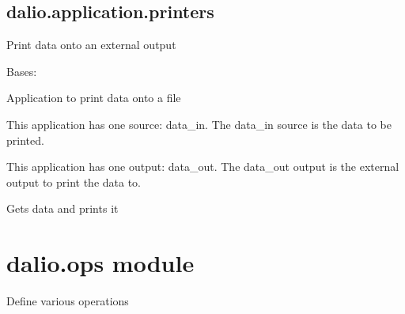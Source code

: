 \documentclass[letterpaper,10pt,english]{sphinxmanual}
\begin{document}
\section{dalio.application.printers}
\label{\detokenize{dalio.application:module-dalio.application.printers}}\label{\detokenize{dalio.application:dalio-application-printers}}
Print data onto an external output

\begin{fulllineitems}
\label{\detokenize{dalio.application:dalio.application.printers.FilePrinter}}
Bases: {\hyperref[\detokenize{dalio.application:dalio.application.application.Application}]{}}

Application to print data onto a file

This application has one source: data\_in. The data\_in source is the data
to be printed.

This application has one output: data\_out. The data\_out output is the
external output to print the data to.

\begin{fulllineitems}
\label{\detokenize{dalio.application:dalio.application.printers.FilePrinter.run}}
Gets data and prints it

\end{fulllineitems}


\end{fulllineitems}



\chapter{dalio.ops module}
\label{\detokenize{dalio.ops:module-dalio.ops}}\label{\detokenize{dalio.ops:dalio-ops-module}}\label{\detokenize{dalio.ops::doc}}
Define various operations
\end{document}
